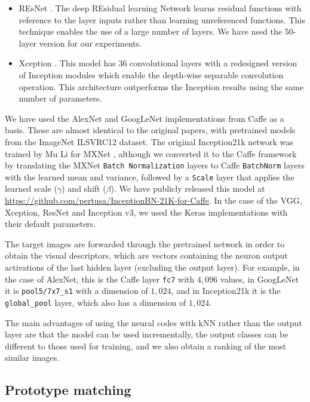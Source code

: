 \documentclass[final, twocolumn]{elsarticle}
\begin{document}
\begin{itemize}
\item REsNet \cite{resnet}. The deep REsidual learning Network learns residual functions with reference to the layer inputs rather than learning unreferenced functions. This technique enables the use of a large number of layers. We have used the 50-layer version for our experiments.  

\item Xception \cite{xception}. This model has 36 convolutional layers with a redesigned version of Inception modules which enable the depth-wise separable convolution operation. This architecture outperforms the Inception results using the same number of parameters. 
\end{itemize}

We have used the AlexNet and GoogLeNet implementations from Caffe \citep{Jia2014CaffeEmbedding} as a basis. These are almost identical to the original papers, with pretrained models from the ImageNet ILSVRC12 dataset. The original Inception21k network was trained by Mu Li for MXNet \citep{MXNet}, although we converted it to the Caffe framework by translating the MXNet \texttt{Batch Normalization} layers to Caffe \texttt{BatchNorm} layers with the learned mean and variance, followed by a \texttt{Scale} layer that applies the learned scale ($\gamma$) and shift ($\beta$). We have publicly released this model at \url{https://github.com/pertusa/InceptionBN-21K-for-Caffe}. In the case of the VGG, Xception, ResNet and Inception v3, we used the Keras \cite{keras} implementations with their default parameters.

The target images are forwarded through the pretrained network in order to obtain the visual descriptors, which are vectors containing the neuron output activations of the last hidden layer (excluding the output layer). For example, in the case of AlexNet, this is the Caffe layer \texttt{fc7} with $4,096$ values, in GoogLeNet it is \texttt{pool5/7x7\_s1} with a dimension of $1,024$, and in Inception21k it is the \texttt{global\_pool} layer, which also has a dimension of $1,024$. 

The main advantages of using the neural codes with kNN rather than the output layer are that the model can be used incrementally, the output classes can be different to those used for training, and we also obtain a ranking of the most similar images. 


\subsection{Prototype matching}
\label{classification}
\end{document}
